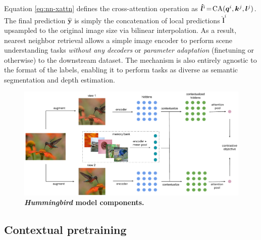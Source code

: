 \documentclass{article}
\newcommand{\oursb}{\textbf{\textit{Hummingbird}}}
\begin{document}
Equation \ref{eq:nn-xattn} defines the cross-attention operation as $\bm{\hat{l}}^{i} \!=\! \text{CA}({\bm{q}}^i, {\bm{k}}^j, {\bm{l}}^j)$. The final prediction $\bm{\hat{y}}$ is simply the concatenation of local predictions $\bm{\hat{l}}^{i}$ upsampled to the original image size via bilinear interpolation. As a result, nearest neighbor retrieval allows a simple image encoder to perform scene understanding tasks \textit{without any decoders} or \textit{parameter adaptation} (finetuning or otherwise) to the downstream dataset. The mechanism is also entirely agnostic to the format of the labels, enabling it to perform tasks as diverse as semantic segmentation and depth estimation.  

\begin{figure}[ht]
  \begin{center}
    \includegraphics[width=.85\textwidth]{figures/hummingbird_model_components.pdf}
  \end{center}
\vspace{-1em}
\caption{\textbf{\oursb \hspace{0.1em} model components.}}
\label{fig:model_components}
\end{figure}

\subsection{Contextual pretraining} \label{sec:contpret}
\end{document}
